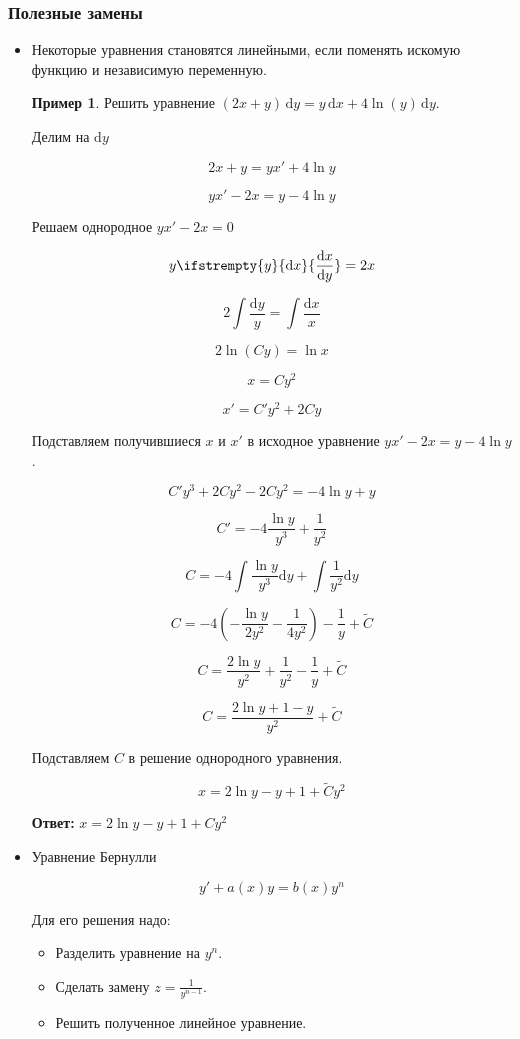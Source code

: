 \documentclass[a4paper, 14pt]{article}
\newcommand{\dx}{\mathrm{d}x}
\newcommand{\dy}{\mathrm{d}y}
\newcommand{\dv}[2]{%
  \ifstrempty{#2}%
    {\mathrm{d}#1}%
    {\frac{\mathrm{d}#1}{\mathrm{d}#2}}%
}
\theoremstyle{definition}
\newtheorem*{example}{Пример}
\newenvironment{answer}
  {\par\noindent\textbf{Ответ:}}
  {\par}
\begin{document}
\subsubsection{Полезные замены}
\begin{itemize}
\item \textbf{}Некоторые уравнения становятся линейными, если поменять искомую функцию и независимую переменную.
\begin{example}
    Решить уравнение $(2x+y)\,\dy = y\,\dx+4\ln{(y)}\,\dy$.

    Делим на $\dy$

    \[2x+y = yx'+4\ln {y}\]

    \[yx' - 2x = y - 4\ln{y}\]

    Решаем однородное $yx' - 2x = 0$

    \[y\dv{x}{y} = 2x\]

    \[2\int{\frac{\dy}{y}} = \int{\frac{\dx}{x}}\]

    \[2\ln{(Cy)} = \ln{x}\]

    \[x=Cy^2\]

    \[x'=C'y^2+2Cy\]

    Подставляем получившиеся $x$ и $x'$ в исходное уравнение $yx' - 2x = y - 4\ln{y}$.

    \[C'y^3+2Cy^2 - 2Cy^2 = -4\ln{y} +y\]

    \[C'= -4\frac{\ln{y}}{y^3}+\frac{1}{y^2}\]

    \[C= -4\int{\frac{\ln{y}}{y^3}}\dy+\int{\frac{1}{y^2}}\dy\]

    \[C = -4(-\frac{\ln{y}}{2y^2}-\frac{1}{4y^2})-\frac{1}{y} +\tilde{C}\]

    \[C = \frac{2\ln{y}}{y^2}+\frac{1}{y^2}-\frac{1}{y} +\tilde{C}\]

    \[C = \frac{2\ln{y}+1-y}{y^2}+\tilde{C}\]

    Подставляем $C$ в решение однородного уравнения.

    \[x=2\ln{y} - y +1 + \tilde{C}y^2\]
    
\end{example}
\begin{answer}
    $x=2\ln{y} - y +1 + Cy^2$
\end{answer}


\item \textbf{}Уравнение Бернулли

\[y'+a(x)y = b(x)y^n\]

Для его решения надо:

\begin{itemize}
\item[\scriptsize\textbullet] Разделить уравнение на $y^n$.
\item[\scriptsize\textbullet] Сделать замену $z=\frac{1}{y^{n-1}}$.
\item[\scriptsize\textbullet] Решить полученное линейное уравнение.
\end{itemize}


\end{itemize}
\end{document}
